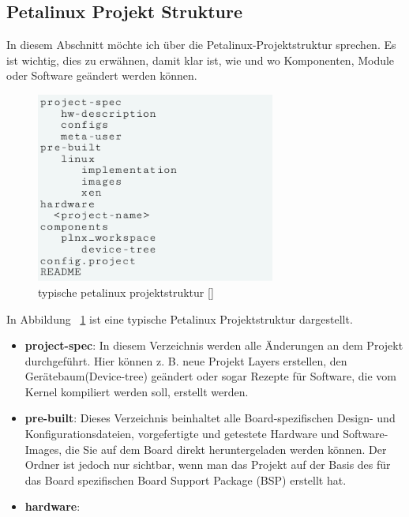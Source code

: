 \subsection{Petalinux Projekt Strukture}
In diesem Abschnitt möchte ich über die Petalinux-Projektstruktur sprechen. Es ist wichtig, dies zu erwähnen, damit klar ist, wie und wo Komponenten, Module oder Software geändert werden können.

\begin{figure}[h]
	\begin{center}
		\includegraphics[width=0.7\textwidth]{./images/petalinux-projektstruktur.jpg}
	\end{center}
	\vspace{-5pt}
	\caption[petalinux Projektstruktur]{typische petalinux projektstruktur [\cite{petailinuxtool}]} %
	\label{fig:petalinux:projektstruktur}
	\vspace{-5pt}
\end{figure}
In Abbildung ~\ref{fig:petalinux:projektstruktur} ist eine typische Petalinux Projektstruktur dargestellt. 

\begin{itemize}
	\item \textbf{project-spec}: In diesem Verzeichnis werden alle Änderungen an dem Projekt durchgeführt. Hier können z. B. neue Projekt Layers erstellen, den Gerätebaum(Device-tree) geändert oder sogar Rezepte für Software, die vom Kernel kompiliert werden soll, erstellt werden. 
	\item \textbf{pre-built}: Dieses Verzeichnis beinhaltet alle Board-spezifischen Design- und Konfigurationsdateien, vorgefertigte und getestete Hardware und Software-Images, die Sie auf dem Board direkt heruntergeladen werden können. Der Ordner ist jedoch nur sichtbar, wenn man das Projekt auf der Basis des für das Board spezifischen Board Support Package (BSP) erstellt hat. 
	\item \textbf{hardware}: 
	 
\end{itemize}
